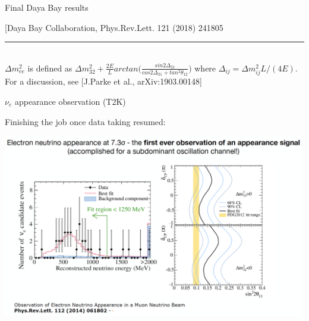 \begin{frame}{Final Daya Bay results}
\vspace{0.1cm}

{\scriptsize \color{blue}[Daya Bay Collaboration, Phys.Rev.Lett. 121 (2018) 241805}

\noindent\rule{2cm}{0.4pt}\\
{\scriptsize
  $\Delta m^2_{ee}$ is defined as
  $\Delta m^2_{32} +
  \frac{2E}{L} arctan\Big(\frac{sin2\Delta_{21}}{cos2\Delta_{21}+tan^{2}\theta_{12}}\Big)$
  where $\Delta_{ij}=\Delta m^2_{ij}L/(4E)$.\\
  For a discussion, see {\color{blue} [J.Parke et al., arXiv:1903.00148]}
}

\end{frame}

%
%
%

%
%


%
%
%

\begin{frame}{$\nu_e$ appearance observation (T2K)}

  Finishing the job once data taking resumed:\\
  \vspace{0.2cm}
  \begin{center}
   \includegraphics[width=0.99\textwidth]{./images/3nu/accelerator/t2k_nueapp_obs}\\
  \end{center}

\end{frame}

%
%
%

